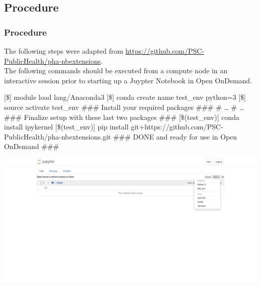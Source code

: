 \subsection[jupenv]{Procedure}
\begin{frame}[fragile]
	\frametitle{Procedure}
	\begin{block}{}
	The following steps were adapted from \url{https://github.com/PSC-PublicHealth/pha-nbextensions}.~\\The following commands should be executed from a compute node in an interactive session prior to starting up a Juypter Notebook in Open OnDemand.
	\end{block}
	\begin{semiverbatim}\footnotesize
	[\$] module load lang/Anaconda3
	[\$] conda create \ddash{}name test\_env python=3
	[\$] source activate test\_env
	\#\#\# Install your required packages \#\#\#
	\# \ldots 
	\# \ldots 
	\#\#\# Finalize setup with these last two packages \#\#\#
	[\$(test\_env)] conda install ipykernel
	[\$(test\_env)] pip install git+https://github.com/PSC-PublicHealth/pha-nbextensions.git
	\#\#\# DONE and ready for use in Open OnDemand \#\#\#
 	\end{semiverbatim}
	\vspace{-1.5em}
	\begin{center}
  \includegraphics[scale=0.08]{juypter.png}
	\end{center}
	
\end{frame}

